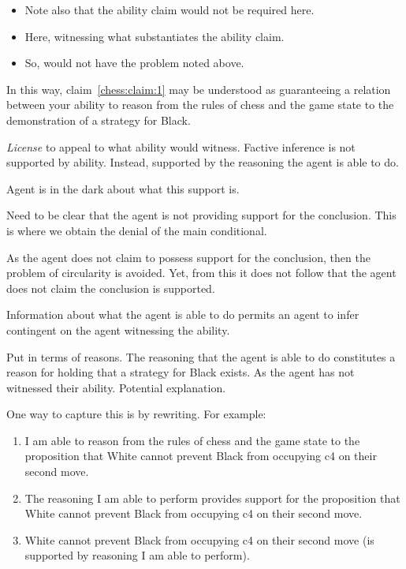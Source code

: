 \documentclass[10pt]{article}
\begin{document}
\begin{itemize}
\item Note also that the ability claim would not be required here.
\item Here, witnessing what substantiates the ability claim.
\item So, would not have the problem noted above.
\end{itemize}

In this way, claim~\ref{chess:claim:1} may be understood as guaranteeing a relation between your ability to reason from the rules of chess and the game state to the demonstration of a strategy for Black.

\emph{License} to appeal to what ability would witness.
Factive inference is not supported by ability.
Instead, supported by the reasoning the agent is able to do.

Agent is in the dark about what this support is.

Need to be clear that the agent is not providing support for the conclusion.
This is where we obtain the denial of the main conditional.

As the agent does not claim to possess support for the conclusion, then the problem of circularity is avoided.
Yet, from this it does not follow that the agent does not claim the conclusion is supported.

Information about what the agent is able to do permits an agent to infer contingent on the agent witnessing the ability.

Put in terms of reasons.
The reasoning that the agent is able to do constitutes a reason for holding that a strategy for Black exists.
As the agent has not witnessed their ability.
Potential explanation.

One way to capture this is by rewriting.
For example:

\begin{enumerate}
\item\label{potential:claim} I am able to reason from the rules of chess and the game state to the proposition that White cannot prevent Black from occupying c4 on their second move.
\item\label{potential:necessity} The reasoning I am able to perform provides support for the proposition that White cannot prevent Black from occupying c4 on their second move.
\item\label{potential:focus} White cannot prevent Black from occupying c4 on their second move (is supported by reasoning I am able to perform).
\end{enumerate}
\end{document}
